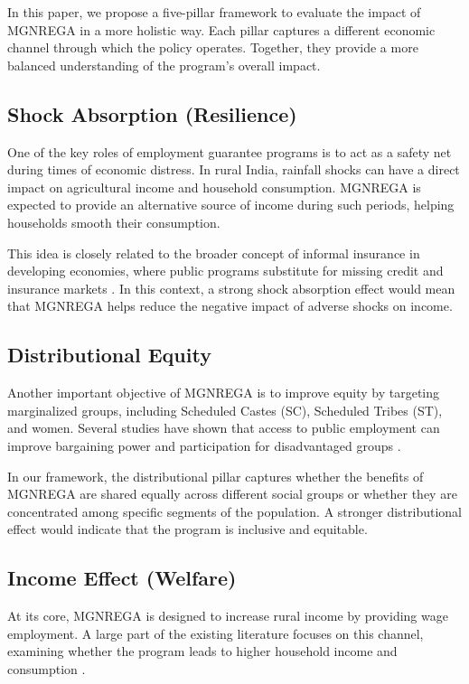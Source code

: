 \documentclass[12pt]{article}
\begin{document}
In this paper, we propose a five-pillar framework to evaluate the impact of MGNREGA in a more holistic way. Each pillar captures a different economic channel through which the policy operates. Together, they provide a more balanced understanding of the program’s overall impact.

\subsection{Shock Absorption (Resilience)}

One of the key roles of employment guarantee programs is to act as a safety net during times of economic distress. In rural India, rainfall shocks can have a direct impact on agricultural income and household consumption. MGNREGA is expected to provide an alternative source of income during such periods, helping households smooth their consumption.

This idea is closely related to the broader concept of informal insurance in developing economies, where public programs substitute for missing credit and insurance markets \citep{Townsend1994}. In this context, a strong shock absorption effect would mean that MGNREGA helps reduce the negative impact of adverse shocks on income.

\subsection{Distributional Equity}

Another important objective of MGNREGA is to improve equity by targeting marginalized groups, including Scheduled Castes (SC), Scheduled Tribes (ST), and women. Several studies have shown that access to public employment can improve bargaining power and participation for disadvantaged groups \citep{Duflo2012}.

In our framework, the distributional pillar captures whether the benefits of MGNREGA are shared equally across different social groups or whether they are concentrated among specific segments of the population. A stronger distributional effect would indicate that the program is inclusive and equitable.

\subsection{Income Effect (Welfare)}

At its core, MGNREGA is designed to increase rural income by providing wage employment. A large part of the existing literature focuses on this channel, examining whether the program leads to higher household income and consumption \citep{ImbertPapp2015}.
\end{document}
